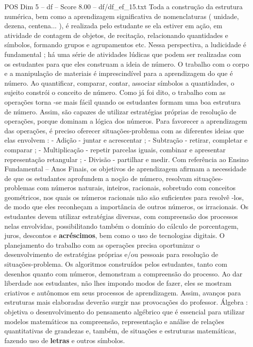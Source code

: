\begin{textsample}{POS Dim 5 – df – Score 8.00 – df/df\_ef\_15.txt}
Toda a construção da estrutura numérica, bem como a aprendizagem significativa de nomenclaturas ( unidade, dezena, centena... ), é realizada pelo estudante se ela estiver em ação, em atividade de contagem de objetos, de recitação, relacionando quantidades e símbolos, formando grupos e agrupamentos etc.
Nessa perspectiva, a ludicidade é fundamental ; há uma série de atividades lúdicas que podem ser realizadas com os estudantes para que eles construam a ideia de número.
O trabalho com o corpo e a manipulação de materiais é imprescindível para a aprendizagem do que é número.
Ao quantificar, comparar, contar, associar símbolos a quantidades, o sujeito constrói o conceito de número.
Como já foi dito, o trabalho com as operações torna -se mais fácil quando os estudantes formam uma boa estrutura de número.
Assim, são capazes de utilizar estratégias próprias de resolução de operações, porque dominam a lógica dos números.
Para favorecer a aprendizagem das operações, é preciso oferecer situações-problema com as diferentes ideias que elas envolvem : - Adição - juntar e acrescentar ; - Subtração - retirar, completar e comparar ; - Multiplicação - repetir parcelas iguais, combinar e apresentar representação retangular ; - Divisão - partilhar e medir.
Com referência ao Ensino Fundamental – Anos Finais, os objetivos de aprendizagem afirmam a necessidade de que os estudantes aprofundem a noção de número, resolvam situações-problemas com números naturais, inteiros, racionais, sobretudo com conceitos geométricos, nos quais os números racionais não são suficientes para resolvê -los, de modo que eles reconheçam a importância de outros números, os irracionais.
Os estudantes devem utilizar estratégias diversas, com compreensão dos processos nelas envolvidas, possibilitando também o domínio do cálculo de porcentagem, juros, descontos e \textbf{acréscimos}, bem como o uso de tecnologias digitais.
O planejamento do trabalho com as operações precisa oportunizar o desenvolvimento de estratégias próprias e/ou pessoais para resolução de situações-problema.
Os algoritmos construídos pelos estudantes, tanto com desenhos quanto com números, demonstram a compreensão do processo.
Ao dar liberdade aos estudantes, não lhes impondo modos de fazer, eles se mostram criativos e autônomos em seus processos de aprendizagem.
Assim, avanços para estruturas mais elaboradas deverão surgir nas provocações do professor.
Álgebra : objetiva o desenvolvimento do pensamento algébrico que é essencial para utilizar modelos matemáticos na compreensão, representação e análise de relações quantitativas de grandezas e, também, de situações e estruturas matemáticas, fazendo uso de \textbf{letras} e outros símbolos.

\end{textsample}
